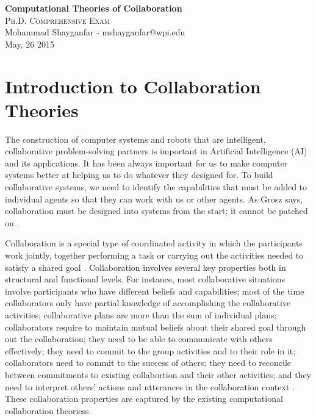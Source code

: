 \documentclass[11pt]{article}
\begin{document}

\begin{center}
{\LARGE{\textbf{Computational Theories of Collaboration}}} \\
\Large\textsc{Ph.D. Comprehensive Exam} \\[1em]
\large\textnormal{Mohammad Shayganfar - mshayganfar@wpi.edu} \\
\large\textnormal{May, 26 2015}
\end{center}

\section{Introduction to Collaboration Theories}

The construction of computer systems and robots that are intelligent,
collaborative problem-solving partners is important in Artificial Intelligence
(AI) and its applications. It has been always important for us to make computer
systems better at helping us to do whatever they designed for. To build
collaborative systems, we need to identify the capabilities that must be added
to individual agents so that they can work with us or other agents. As Grosz
says, collaboration must be designed into systems from the start; it cannot be
patched on \cite{grosz:collaborative-systems}.

Collaboration is a special type of coordinated activity in which the
participants work jointly, together performing a task or carrying out the
activities needed to satisfy a shared goal \cite{grosz:collaboration}.
Collaboration involves several key properties both in structural and functional
levels. For instance, most collaborative situations involve participants who
have different beliefs and capabilities; most of the time collaborators only
have partial knowledge of accomplishing the collaborative activities;
collaborative plans are more than the sum of individual plans; collaborators
require to maintain mutual beliefs about their shared goal through out the
collaboration; they need to be able to communicate with others effectively;
they need to commit to the group activities and to their role in it;
collaborators need to commit to the success of others; they need to reconcile
between commitments to existing collabortion and their other activities;
and they need to interpret others' actions and utterances in the collaboration
context \cite{grosz:mice-menus}. These collaboration properties are captured by
the existing computational collaboration theoriess.
\end{document}
